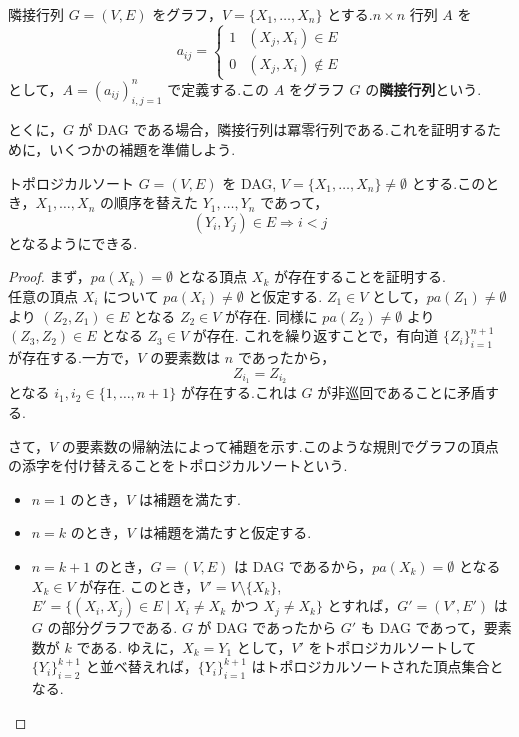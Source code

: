 \documentclass[uplatex, dvipdfmx]{jsarticle}
\begin{document}
\begin{defn}{隣接行列}
  $G = (V, E)$ をグラフ，$V = \{X_1, \dots, X_n\}$ とする.$n \times n$ 行列 $A$ を
  \begin{equation}
    a_{ij} = 
    \begin{cases} 
      1 & (X_j, X_i) \in E \\
      0 & (X_j, X_i) \notin E 
    \end{cases}
  \end{equation}
  として，$A = (a_{ij})_{i,j=1}^n$ で定義する.この $A$ をグラフ $G$ の\textbf{隣接行列}という.
\end{defn}

とくに，$G$ が DAG である場合，隣接行列は冪零行列である.これを証明するために，いくつかの補題を準備しよう.

\begin{prop}[label={prop:TopoSort}]{トポロジカルソート}
  $G = (V, E)$ を DAG, $V = \{X_1, \dots, X_n\} \neq \emptyset$ とする.このとき，$X_1, \dots, X_n$ の順序を替えた $Y_1, \dots, Y_n$ であって，
  \begin{equation}
    (Y_i, Y_j) \in E \Rightarrow i < j
  \end{equation}
  となるようにできる.
\end{prop}

\begin{proof}
  まず，$pa(X_k) = \emptyset$ となる頂点 $X_k$ が存在することを証明する.\\
  任意の頂点 $X_i$ について $pa(X_i) \neq \emptyset$ と仮定する.
  $Z_1 \in V$ として，$pa(Z_1) \neq \emptyset$ より $(Z_2, Z_1) \in E$ となる $Z_2 \in V$ が存在.
  同様に $pa(Z_2) \neq \emptyset$ より $(Z_3, Z_2) \in E$ となる $Z_3 \in V$ が存在.
  これを繰り返すことで，有向道 $\{Z_i\}_{i=1}^{n+1}$ が存在する.一方で，$V$ の要素数は $n$ であったから，
  \begin{equation}
  Z_{i_1} = Z_{i_2}
  \end{equation}
  となる $i_1, i_2 \in \{1, \dots, n+1\}$ が存在する.これは $G$ が非巡回であることに矛盾する.

  さて，$V$ の要素数の帰納法によって補題を示す.このような規則でグラフの頂点の添字を付け替えることをトポロジカルソートという.
  \begin{itemize}
      \item $n=1$ のとき，$V$ は補題を満たす.
      \item $n=k$ のとき，$V$ は補題を満たすと仮定する.
      \item $n=k+1$ のとき，$G = (V, E)$ は DAG であるから，$pa(X_k) = \emptyset$ となる $X_k \in V$ が存在.
      このとき，$V' = V \setminus \{X_k\}$, $E' = \{ (X_i, X_j) \in E \mid X_i \neq X_k \text{ かつ } X_j \neq X_k \}$ とすれば，$G' = (V', E')$ は $G$ の部分グラフである.
      $G$ が DAG であったから $G'$ も DAG であって，要素数が $k$ である.
      ゆえに，$X_k = Y_1$ として，$V'$ をトポロジカルソートして $\{Y_i\}_{i=2}^{k+1}$ と並べ替えれば，$\{Y_i\}_{i=1}^{k+1}$ はトポロジカルソートされた頂点集合となる.
  \end{itemize}
\end{proof}
\end{document}
